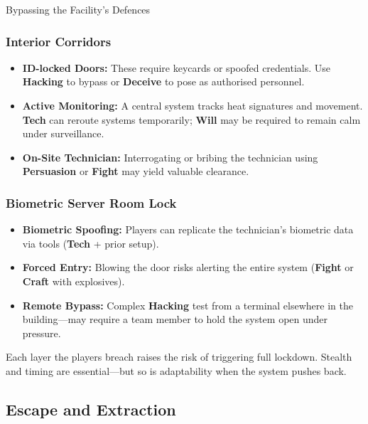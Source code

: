 \documentclass[nodeprecatedcode,bg=print]{dndbook}
\begin{document}
\begin{multicols}{2}
\begin{CommentBox}{Bypassing the Facility’s Defences}
    \vspace{0.5\baselineskip}
    
    \subsubsection*{Interior Corridors}
    \begin{itemize}
        \item \textbf{ID-locked Doors:} These require keycards or spoofed credentials. Use \textbf{Hacking} to bypass or \textbf{Deceive} to pose as authorised personnel.
        \item \textbf{Active Monitoring:} A central system tracks heat signatures and movement. \textbf{Tech} can reroute systems temporarily; \textbf{Will} may be required to remain calm under surveillance.
        \item \textbf{On-Site Technician:} Interrogating or bribing the technician using \textbf{Persuasion} or \textbf{Fight} may yield valuable clearance.
    \end{itemize}
    
    \vspace{0.5\baselineskip}
    
    \subsubsection*{Biometric Server Room Lock}
    \begin{itemize}
        \item \textbf{Biometric Spoofing:} Players can replicate the technician’s biometric data via tools (\textbf{Tech} + prior setup).
        \item \textbf{Forced Entry:} Blowing the door risks alerting the entire system (\textbf{Fight} or \textbf{Craft} with explosives).
        \item \textbf{Remote Bypass:} Complex \textbf{Hacking} test from a terminal elsewhere in the building—may require a team member to hold the system open under pressure.
    \end{itemize}
    
    Each layer the players breach raises the risk of triggering full lockdown. Stealth and timing are essential—but so is adaptability when the system pushes back.
\end{CommentBox}
    

\subsection*{Escape and Extraction}


\end{multicols}
\end{document}
